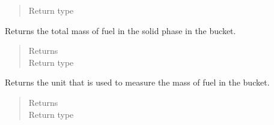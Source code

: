 \documentclass[letterpaper,10pt,openany,oneside,english]{sphinxmanual}
\begin{document}
\begin{fulllineitems}
\begin{fulllineitems}
\begin{quote}
\begin{description}
\item[{Return type}] \leavevmode
{}

\end{description}\end{quote}

\end{fulllineitems}


\begin{fulllineitems}
\label{\detokenize{support_rst/fuel_bucket:fuel_bucket.FuelBucket.fuel_mass}}
Returns the total mass of fuel in the solid phase in the bucket.
\begin{quote}\begin{description}
\item[{Returns}] \leavevmode
{}

\item[{Return type}] \leavevmode
{}

\end{description}\end{quote}

\end{fulllineitems}


\begin{fulllineitems}
\label{\detokenize{support_rst/fuel_bucket:fuel_bucket.FuelBucket.fuel_mass_unit}}
Returns the unit that is used to measure the mass of fuel in the
bucket.
\begin{quote}\begin{description}
\item[{Returns}] \leavevmode
{}

\item[{Return type}] \leavevmode
{}

\end{description}\end{quote}

\end{fulllineitems}



\end{fulllineitems}
\end{document}
